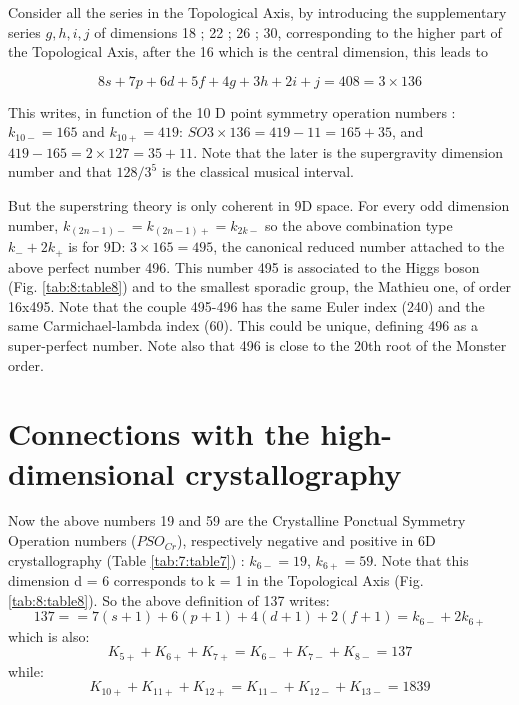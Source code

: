 \documentclass[a4paper,9pt]{article}
\begin{document}
     Consider all the series in the Topological Axis, by introducing the supplementary series $g, h, i, j$ of dimensions 18 ; 22 ; 26 ; 30, corresponding to the higher part of the Topological Axis, after the 16 which is the central dimension, this leads to
     
     \begin{equation}
      8s + 7p + 6 d + 5f + 4g + 3h + 2i + j = 408 = 3 \times 136   
     \end{equation}
      
     
     This writes, in function of the 10 D point symmetry operation numbers :  $k_{10-} = 165$ and $k_{10+} = 419$: $SO3 \times 136 = 419 - 11 = 165 + 35$, and $419-165 = 2 \times 127 =  35 + 11$. Note that the later is the supergravity dimension number and that $128/3^5$ is the classical musical interval. 
     
     
     But the superstring theory is only coherent in 9D space. For every odd dimension number, $k_{(2n - 1)-} = k_{(2n - 1)+} = k_{2k-}$ so the above combination type $k_- + 2k_+$ is for 9D: $3 \times 165 = 495$, the canonical reduced number attached to the above perfect number 496. This number 495 is associated to the Higgs boson (Fig. \ref{tab:8:table8}) and to the smallest sporadic group, the Mathieu one, of order 16x495. Note that the couple 495-496 has the same Euler index (240) and the same Carmichael-lambda index (60). This could be unique, defining 496 as a super-perfect number. Note also that 496 is close to the 20th root of the Monster order.
 
 
 
 
 
 
 
 
 
 \section{Connections with the high-dimensional crystallography}
 
 Now the above numbers 19 and 59 are the Crystalline Ponctual Symmetry Operation numbers ($PSO_{Cr}$), respectively negative and positive in 6D crystallography \cite{Weigel} (Table \ref{tab:7:table7}) : $k_{6-} = 19$, $k_{6+} = 59$. Note that this dimension d = 6 corresponds to k = 1 in the Topological Axis (Fig. \ref{tab:8:table8}). So the above definition of 137 writes:
  \begin{equation}
   137 =   = 7(s +1) + 6(p +1) + 4(d +1) + 2(f +1) = k_{6-} + 2k_{6+}   
    \end{equation}
    which is also:
    \begin{equation}
    K_{5+}+K_{6+}+K_{7+} = K_{6-} + K_{7-} +K_{8-} = 137   
    \end{equation}
    while:
    \begin{equation}
    K_{10+} +K_{11+}+K_{12+} = K_{11-} +K_{12-}+K_{13-} = 1839   
    \end{equation}
    
\end{document}
